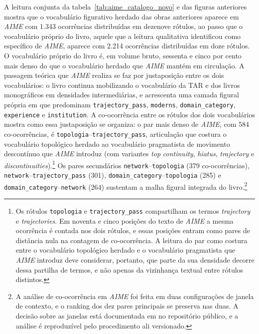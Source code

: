 A leitura conjunta da tabela~\ref{tab:aime_catalogo_novo} e das figuras anteriores mostra que o vocabulário figurativo herdado das obras anteriores aparece em \textit{AIME} com 1.343 ocorrências distribuídas em dezenove rótulos, ao passo que o vocabulário próprio do livro, aquele que a leitura qualitativa identificou como específico de \textit{AIME}, aparece com 2.214 ocorrências distribuídas em doze rótulos. O vocabulário próprio do livro é, em volume bruto, sessenta e cinco por cento mais denso do que o vocabulário herdado que \textit{AIME} mantém em circulação. A passagem teórica que \textit{AIME} realiza se faz por justaposição entre os dois vocabulários: o livro continua mobilizando o vocabulário da TAR e dos livros monográficos em densidades intermediárias, e acrescenta uma camada figural própria em que predominam \texttt{trajectory\_pass}, \texttt{moderns}, \texttt{domain\_category}, \texttt{experience} e \texttt{institution}. A co-ocorrência entre os rótulos dos dois vocabulários mostra como essa justaposição se organiza: o par mais denso de \textit{AIME}, com 584 co-ocorrências, é \texttt{topologia}--\texttt{trajectory\_pass}, articulação que costura o vocabulário topológico herdado ao vocabulário pragmatista de movimento descontínuo que \textit{AIME} introduz (com variantes \emph{top} \emph{continuity}, \emph{hiatus}, \emph{trajectory} e \emph{discontinuities}).\footnote{Os rótulos \texttt{topologia} e \texttt{trajectory\_pass} compartilham os termos \emph{trajectory} e \emph{trajectories}. Em noventa e cinco posições do texto de \textit{AIME} a mesma ocorrência é contada nos dois rótulos, e essas posições entram como pares de distância nula na contagem de co-ocorrência. A leitura do par como costura entre o vocabulário topológico herdado e o vocabulário pragmatista que \textit{AIME} introduz deve considerar, portanto, que parte da sua densidade decorre dessa partilha de termos, e não apenas da vizinhança textual entre rótulos distintos.} Os pares secundários \texttt{network}--\texttt{topologia} (379 co-ocorrências), \texttt{network}--\texttt{trajectory\_pass} (301), \texttt{domain\_category}--\texttt{topologia} (285) e \texttt{domain\_category}--\texttt{network} (264) sustentam a malha figural integrada do livro.\footnote{A análise de co-ocorrência em \textit{AIME} foi feita em duas configurações de janela de contexto, e o ranking dos dez pares principais se preserva nas duas. A decisão sobre as janelas está documentada em  no repositório público, e a análise é reproduzível pelo procedimento ali versionado.}

